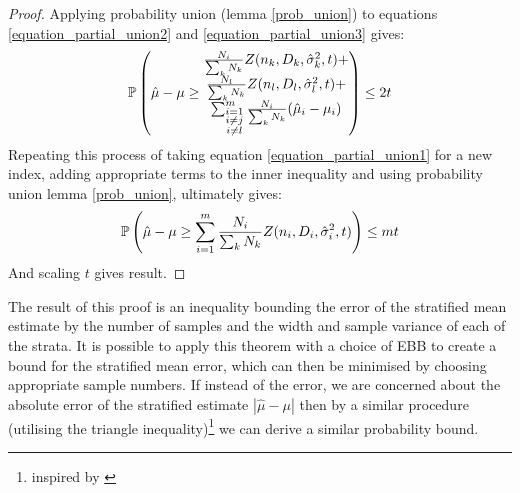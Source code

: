 \begin{proof}
Applying probability union (lemma \ref{prob_union}) to equations \ref{equation_partial_union2} and \ref{equation_partial_union3} gives:
$$ \p\left(\hat{\mu}-\mu \ge \begin{matrix*} \frac{N_i}{\sum_kN_k}Z(n_k,D_k,\hat{\sigma}^2_k,t) +\\ \frac{N_l}{\sum_kN_k}Z(n_l,D_l,\hat{\sigma}^2_l,t) +\\ \sum_{\substack{i=1 \\ i\ne j\\i\ne l}}^m\frac{N_i}{\sum_kN_k}(\hat{\mu}_i-\mu_i)\end{matrix*}\right) \le 2t $$
Repeating this process of taking equation \ref{equation_partial_union1} for a new index, adding appropriate terms to the inner inequality and using probability union lemma \ref{prob_union}, ultimately gives:
$$ \operatorname{\mathbb{P}}\left(\hat{\mu}-\mu \ge \sum_{i=1}^m\frac{N_i}{\sum_kN_k} Z(n_i,D_i,\hat{\sigma}^2_i,t)\right)\le mt $$
And scaling $t$ gives result.
\end{proof}

The result of this proof is an inequality bounding the error of the stratified mean estimate by the number of samples and the width and sample variance of each of the strata.
It is possible to apply this theorem with a choice of EBB to create a bound for the stratified mean error, which can then be minimised by choosing appropriate sample numbers.
If instead of the error, we are concerned about the absolute error of the stratified estimate $|\hat{\mu}-\mu|$ then by a similar procedure (utilising the triangle inequality)\footnote{inspired by \cite{2013arXiv1306.4265M}} we can derive a similar probability bound.

